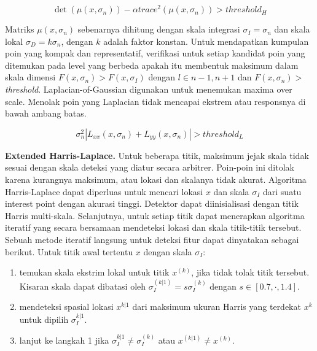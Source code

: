 \begin{equation}
  \det(\mu(x,\sigma_{n}))-\alpha trace^{2}(\mu(x,\sigma_{n})) > threshold_{H}
\end{equation}

Matriks \(\mu(x,\sigma_{n})\) sebenarnya dihitung dengan skala integrasi \(\sigma_{I} = \sigma_{n}\) dan skala lokal \(\sigma_{D} = k \sigma_{n}\), dengan \(k\) adalah faktor konstan. Untuk mendapatkan kumpulan poin yang kompak dan representatif, verifikasi untuk setiap kandidat poin yang ditemukan pada level yang berbeda apakah itu membentuk maksimum dalam skala dimensi \(F(x,\sigma_{n}) > F(x,\sigma_{I})\) dengan \(l \in  {n-1,n+1}\) dan \(F(x,\sigma_{n}) >\) \emph{threshold}. Laplacian-of-Gaussian digunakan untuk menemukan maxima over scale. Menolak poin yang Laplacian tidak mencapai ekstrem atau responsnya di bawah ambang batas.

\begin{equation}
  \sigma^{2}_{n}| L_{xx}(x,\sigma_{n}) + L_{yy}(x, \sigma_{n})| > threshold_{L}
\end{equation}

\textbf{Extended Harris-Laplace.} Untuk beberapa titik, maksimum jejak skala tidak sesuai dengan skala deteksi yang diatur secara arbitrer. Poin-poin ini ditolak karena kurangnya maksimum, atau lokasi dan skalanya tidak akurat. Algoritma Harris-Laplace dapat diperluas untuk mencari lokasi \(x\) dan skala \(\sigma_{I}\) dari suatu interest point dengan akurasi tinggi. Detektor dapat diinisialisasi dengan titik Harris multi-skala. Selanjutnya, untuk setiap titik dapat menerapkan algoritma iteratif yang secara bersamaan mendeteksi lokasi dan skala titik-titik tersebut. Sebuah metode iteratif langsung untuk deteksi fitur dapat dinyatakan sebagai berikut. Untuk titik awal tertentu \(x\) dengan skala \(\sigma_{I}\):

\begin{enumerate}
	\item temukan skala ekstrim lokal untuk titik \(x^{(k)}\), jika tidak tolak titik tersebut. Kisaran skala dapat dibatasi oleh \(\sigma^{(k|1)}_{I} = s\sigma_{I}^{(k)}\) dengan \(s \in [0.7 , \cdot , 1.4]\).
	\item mendeteksi spasial lokasi \(x^{k|1}\) dari maksimum ukuran Harris yang terdekat \(x^{k}\) untuk dipilih \(\sigma^{k|1}_{I}\).
	\item lanjut ke langkah 1 jika \(\sigma^{k|1}_{I} \neq \sigma^{(k)}_{I}\) atau \(x^{(k|1)} \neq x^{(k)}\).
\end{enumerate}


